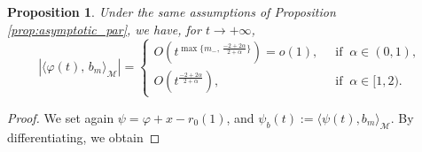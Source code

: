 \documentclass[a4paper,10pt]{amsart}
\theoremstyle{plain}
\newtheorem{prop}[thm]{Proposition}
\theoremstyle{definition}
\numberwithin{equation}{section}
\numberwithin{thm}{section}
\begin{document}
\begin{prop} Under the same assumptions of Proposition \ref{prop:asymptotic_par}, we have, for $t \rightarrow+\infty$,
    \begin{equation}
    \label{eq:estimate_psi_b}
|\langle\varphi(t), \, b_m\rangle_\mathcal{M}| =\begin{cases}
    O(t^{\max\{m_-, \, \frac{-2+2\alpha}{2+\alpha}\}})=o(1), \ &\mbox{ if } \ \alpha \in (0,1),
    \\
    O(t^{\frac{-2+2\alpha}{2+\alpha}}), \ &\mbox{ if } \ \alpha \in [1,2).
\end{cases}
\end{equation}
\end{prop} 
\begin{proof} 
We set again $\psi=\varphi +x-r_0(1)$, and $\psi_b(t):=\langle \psi(t), b_m\rangle_{\mathcal M}$. By differentiating, we obtain



\end{proof}
\end{document}
